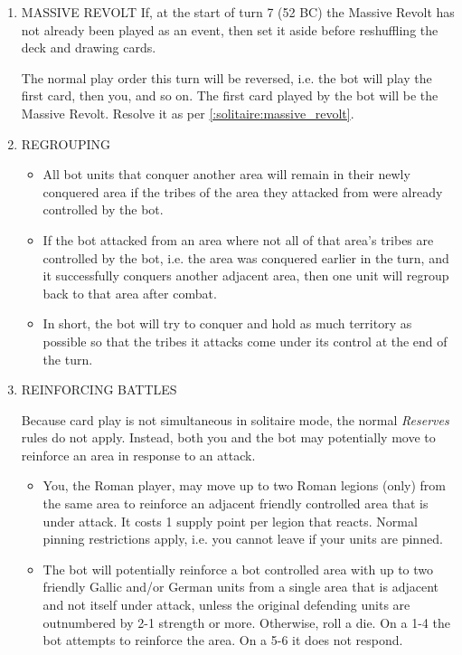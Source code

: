 \begin{enumerate}
  \item MASSIVE REVOLT
  If, at the start of turn 7 (52 BC) the Massive Revolt has not already been played as an event, then set it aside before reshuffling the deck and drawing cards.
  
  The normal play order this turn will be reversed, i.e. the bot will play the first card, then you, and so on. The first card played by the bot will be the Massive Revolt. Resolve it as per \ref{:solitaire:massive_revolt}.
  
  \item REGROUPING
  \begin{itemize}
    \item All bot units that conquer another area will remain in their newly conquered area if the tribes of the area they attacked from were already controlled by the bot.
    
    \item If the bot attacked from an area where not all of that area's tribes are controlled by the bot, i.e. the area was conquered earlier in the turn, and it successfully conquers another adjacent area, then one unit will regroup back to that area after combat.
    
    \item In short, the bot will try to conquer and hold as much territory as possible so that the tribes it attacks come under its control at the end of the turn.
  \end{itemize}
  
  \item REINFORCING BATTLES
  
  Because card play is not simultaneous in solitaire mode, the normal \textit{Reserves} rules do not apply. Instead, both you and the bot may potentially move to reinforce an area in response to an attack.
  
  \begin{itemize}
    \item You, the Roman player, may move up to two Roman legions (only) from the same area to reinforce an adjacent friendly controlled area that is under attack. It costs 1 supply point per legion that reacts. Normal pinning restrictions apply, i.e. you cannot leave if your units are pinned.
    
    \item The bot will potentially reinforce a bot controlled area with up to two friendly Gallic and/or German units from a single area that is adjacent and not itself under attack, unless the original defending units are outnumbered by 2-1 strength or more. Otherwise, roll a die. On a 1-4 the bot attempts to reinforce the area. On a 5-6 it does not respond.
    

\end{itemize}
\end{enumerate}
